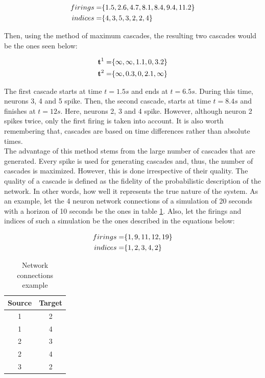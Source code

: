 \begin{align}
	\centering
	firings = &\{1.5, 2.6, 4.7, 8.1, 8.4, 9.4, 11.2\}\\
	indices = &\{4,  3,  5,  3,  2,  2, 4\}
\end{align}

Then, using the method of maximum cascades, the resulting two cascades would be the ones seen below:

\begin{align}
	\centering
	\textbf{t}^{1} = &\{\infty, \infty, 1.1, 0, 3.2 \}\\
	\textbf{t}^{2} = &\{\infty, 0.3, 0, 2.1, \infty \}
\end{align}

The first cascade starts at time \(t=1.5 s\) and ends at \(t=6.5 s\). During this time, neurons 3, 4 and 5 spike. Then, the second cascade, starts at time \(t=8.4 s\) and finishes at \(t=12 s\). Here, neurons 2, 3 and 4 spike. However, although neuron 2 spikes twice, only the first firing is taken into account. It is also worth remembering that, cascades are based on time differences rather than absolute times. \\

The advantage of this method stems from the large number of cascades that are generated. Every spike is used for generating cascades and, thus, the number of cascades is maximized. However, this is done irrespective of their quality. The quality of a cascade is defined as the fidelity of the probabilistic description of the network. In other words, how well it represents the true nature of the system. As an example, let the 4 neuron network connections of a simulation of 20 seconds with a horizon of 10 seconds be the ones in table \ref{tab:quality_cascades}. Also, let the firings and indices of such a simulation be the ones described in the equations below: 

\begin{align}
	\centering
	firings = &\{1, 9, 11, 12, 19\}\\
	indices = &\{1, 2,  3,  4, 2\} 
	\label{eq:quality_cascades}
\end{align}

\begin{table}[H]
\centering
\begin{tabular}{|c|c|}
\hline
Source & Target \\ \hline
1      & 2      \\ \hline
1      & 4      \\ \hline
2      & 3      \\ \hline
2      & 4      \\ \hline
3      & 2      \\ \hline
\end{tabular}
\caption{Network connections example}
\label{tab:quality_cascades}
\end{table}

